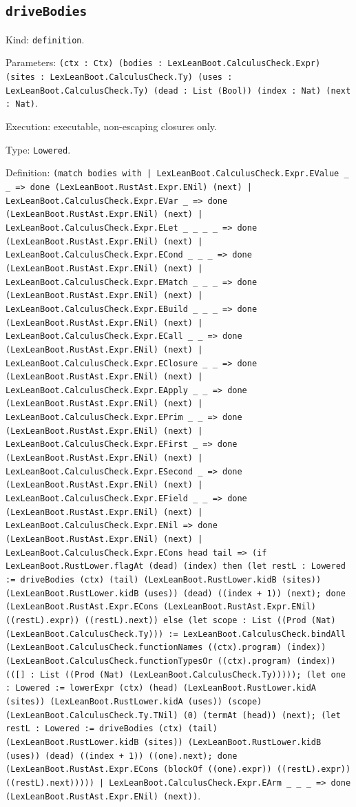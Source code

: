 \documentclass[11pt]{article}
\begin{document}
\subsection*{\texttt{driveBodies}}
\noindent Kind: \texttt{definition}.\par
\noindent Parameters: \texttt{(ctx : Ctx) (bodies : LexLeanBoot.CalculusCheck.Expr) (sites : LexLeanBoot.CalculusCheck.Ty) (uses : LexLeanBoot.CalculusCheck.Ty) (dead : List (Bool)) (index : Nat) (next : Nat)}.\par
\noindent Execution: executable, non-escaping closures only.\par
\noindent Type: \texttt{Lowered}.\par
\noindent Definition: \texttt{(match bodies with | LexLeanBoot.CalculusCheck.Expr.EValue \_ \_ => done (LexLeanBoot.RustAst.Expr.ENil) (next) | LexLeanBoot.CalculusCheck.Expr.EVar \_ => done (LexLeanBoot.RustAst.Expr.ENil) (next) | LexLeanBoot.CalculusCheck.Expr.ELet \_ \_ \_ \_ => done (LexLeanBoot.RustAst.Expr.ENil) (next) | LexLeanBoot.CalculusCheck.Expr.ECond \_ \_ \_ => done (LexLeanBoot.RustAst.Expr.ENil) (next) | LexLeanBoot.CalculusCheck.Expr.EMatch \_ \_ \_ => done (LexLeanBoot.RustAst.Expr.ENil) (next) | LexLeanBoot.CalculusCheck.Expr.EBuild \_ \_ \_ => done (LexLeanBoot.RustAst.Expr.ENil) (next) | LexLeanBoot.CalculusCheck.Expr.ECall \_ \_ => done (LexLeanBoot.RustAst.Expr.ENil) (next) | LexLeanBoot.CalculusCheck.Expr.EClosure \_ \_ => done (LexLeanBoot.RustAst.Expr.ENil) (next) | LexLeanBoot.CalculusCheck.Expr.EApply \_ \_ => done (LexLeanBoot.RustAst.Expr.ENil) (next) | LexLeanBoot.CalculusCheck.Expr.EPrim \_ \_ => done (LexLeanBoot.RustAst.Expr.ENil) (next) | LexLeanBoot.CalculusCheck.Expr.EFirst \_ => done (LexLeanBoot.RustAst.Expr.ENil) (next) | LexLeanBoot.CalculusCheck.Expr.ESecond \_ => done (LexLeanBoot.RustAst.Expr.ENil) (next) | LexLeanBoot.CalculusCheck.Expr.EField \_ \_ => done (LexLeanBoot.RustAst.Expr.ENil) (next) | LexLeanBoot.CalculusCheck.Expr.ENil => done (LexLeanBoot.RustAst.Expr.ENil) (next) | LexLeanBoot.CalculusCheck.Expr.ECons head tail => (if LexLeanBoot.RustLower.flagAt (dead) (index) then (let restL : Lowered := driveBodies (ctx) (tail) (LexLeanBoot.RustLower.kidB (sites)) (LexLeanBoot.RustLower.kidB (uses)) (dead) ((index + 1)) (next); done (LexLeanBoot.RustAst.Expr.ECons (LexLeanBoot.RustAst.Expr.ENil) ((restL).expr)) ((restL).next)) else (let scope : List ((Prod (Nat) (LexLeanBoot.CalculusCheck.Ty))) := LexLeanBoot.CalculusCheck.bindAll (LexLeanBoot.CalculusCheck.functionNames ((ctx).program) (index)) (LexLeanBoot.CalculusCheck.functionTypesOr ((ctx).program) (index)) (([] : List ((Prod (Nat) (LexLeanBoot.CalculusCheck.Ty))))); (let one : Lowered := lowerExpr (ctx) (head) (LexLeanBoot.RustLower.kidA (sites)) (LexLeanBoot.RustLower.kidA (uses)) (scope) (LexLeanBoot.CalculusCheck.Ty.TNil) (0) (termAt (head)) (next); (let restL : Lowered := driveBodies (ctx) (tail) (LexLeanBoot.RustLower.kidB (sites)) (LexLeanBoot.RustLower.kidB (uses)) (dead) ((index + 1)) ((one).next); done (LexLeanBoot.RustAst.Expr.ECons (blockOf ((one).expr)) ((restL).expr)) ((restL).next))))) | LexLeanBoot.CalculusCheck.Expr.EArm \_ \_ \_ => done (LexLeanBoot.RustAst.Expr.ENil) (next))}.\par
\end{document}
